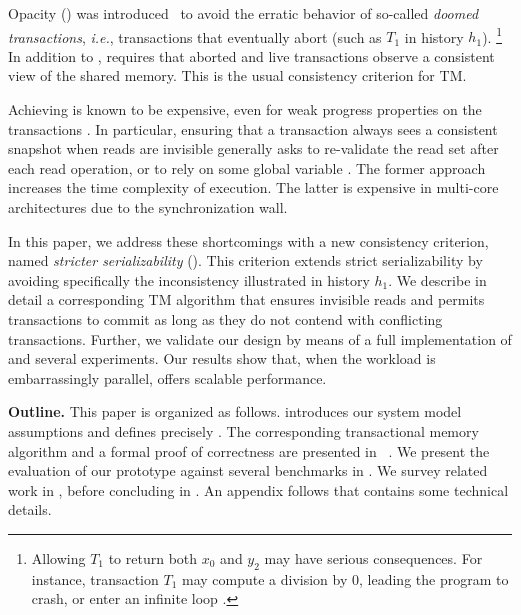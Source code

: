 Opacity (\OPA) was introduced~\cite{guerraoui2008correctness} to avoid the erratic behavior of so-called \emph{doomed transactions}, \emph{i.e.}, transactions that eventually abort (such as $T_1$ in history $h_1$).%
\footnote{
  Allowing $T_1$ to return both $x_0$ and $y_2$ may have serious consequences.
  For instance, transaction $T_1$ may compute a division by $0$, leading the program to crash, or enter an infinite loop \cite{guerraoui2008correctness}.
}
In addition to \SSER, \OPA requires that aborted and live transactions observe a consistent view of the shared memory.
This is the usual consistency criterion for TM.

Achieving \OPA is known to be expensive, even for weak progress properties on the transactions \cite{Ravi17}.
In particular, ensuring that a transaction always sees a consistent snapshot when reads are invisible generally asks to re-validate the read set after each read operation, or to rely on some global variable \cite{bookTM}.
The former approach increases the time complexity of execution.
The latter is expensive in multi-core architectures due to the synchronization wall.

In this paper, we address these shortcomings with a new consistency criterion, named \emph{stricter serializability} (\SPSER).
This criterion extends strict serializability by avoiding specifically the inconsistency illustrated in history $h_1$.
We describe in detail a corresponding TM algorithm that ensures invisible reads and permits transactions to commit as long as they do not contend with conflicting transactions.
Further, we validate our design by means of a full implementation of \SPSER and several experiments.
Our results show that, when the workload is embarrassingly parallel, \SPSER offers scalable performance.

\textbf{Outline.}
This paper is organized as follows.
 introduces our system model assumptions and defines precisely \SPSER.
The corresponding transactional memory algorithm and a formal proof of correctness are presented in ~.
We present the evaluation of our prototype against several benchmarks in .
We survey related work in , before concluding in .
%
An appendix follows that contains some technical details.
